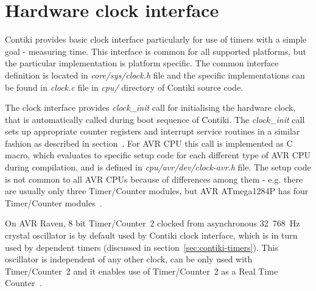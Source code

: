 
\section{Hardware clock interface}
Contiki provides basic clock interface particularly for use of timers
with a simple goal - measuring time.
This interface is common for all supported platforms,
but the particular implementation is platform specific.
The common interface definition is located in {\it{core/sys/clock.h}} file
and the specific implementations can be found in {\it{clock.c}} file
in {\it{cpu/}} directory of Contiki source code.

The clock interface provides {\it{clock\_init}} call for initialising the hardware clock,
that is automatically called during boot sequence of Contiki.
The {\it{clock\_init}} call sets up
appropriate counter registers and interrupt service routines in a similar fashion
as described in section~\cite{sec:system-keeping-and-providing}.
For AVR CPU this call is implemented as C macro, which evaluates to specific setup code for each
different type of AVR CPU during compilation, and is defined in {\it{cpu/avr/dev/clock-avr.h}} file.
The setup code is not common to all AVR CPUs because of differences among them - e.g. there are usually
only three Timer/Counter modules, but AVR ATmega1284P has four Timer/Counter modules~\cite{avr-datasheet}.

On AVR Raven, 8 bit Timer/Counter~2 clocked from asynchronous 32~768~Hz crystal oscillator
is by default used by Contiki clock interface,
which is in turn used by dependent timers (discussed in section~\ref{sec:contiki-timers}).
This oscillator is independent of any other clock,
can be only used with Timer/Counter~2 and it
enables use of Timer/Counter~2 as a Real Time Counter~\cite{avr-datasheet}.


